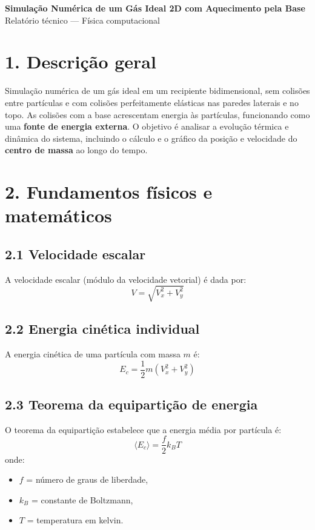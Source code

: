 \documentclass[12pt,a4paper]{article}
\begin{document}
\begin{center}
\LARGE \textbf{Simulação Numérica de um Gás Ideal 2D com Aquecimento pela Base}\\[0.5cm]
\large Relatório técnico — Física computacional
\end{center}

\section*{1. Descrição geral}

Simulação numérica de um gás ideal em um recipiente bidimensional, sem colisões entre partículas e com colisões perfeitamente elásticas nas paredes laterais e no topo. 
As colisões com a base acrescentam energia às partículas, funcionando como uma \textbf{fonte de energia externa}.
O objetivo é analisar a evolução térmica e dinâmica do sistema, incluindo o cálculo e o gráfico da posição e velocidade do \textbf{centro de massa} ao longo do tempo.

\section*{2. Fundamentos físicos e matemáticos}

\subsection*{2.1 Velocidade escalar}
A velocidade escalar (módulo da velocidade vetorial) é dada por:
\begin{equation}
    V = \sqrt{V_x^2 + V_y^2}
\end{equation}

\subsection*{2.2 Energia cinética individual}
A energia cinética de uma partícula com massa $m$ é:
\begin{equation}
    E_c = \frac{1}{2} m (V_x^2 + V_y^2)
\end{equation}

\subsection*{2.3 Teorema da equipartição de energia}
O teorema da equipartição estabelece que a energia média por partícula é:
\begin{equation}
    \langle E_c \rangle = \frac{f}{2} k_B T
\end{equation}
onde:
\begin{itemize}
    \item $f$ = número de graus de liberdade,
    \item $k_B$ = constante de Boltzmann,
    \item $T$ = temperatura em kelvin.
\end{itemize}
\end{document}
